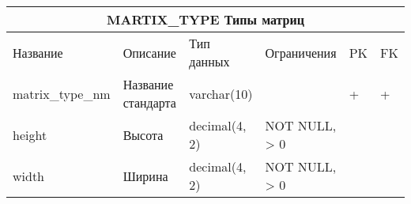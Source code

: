\documentclass{article}
\begin{document}
\begin{tabular}{ |p{4cm}|p{4cm}|p{2.5cm}|p{3.5cm}|p{2cm}|p{1cm}| }
\hline
\multicolumn{6}{|c|}{MARTIX\_TYPE Типы матриц} \\
\hline
Название & Описание & Тип данных & Ограничения & PK & FK\\
\hline
matrix\_type\_nm                    &   %
Название стандарта                  &   %
varchar(10)                         &   %
                                    &   %
 +                                  &   %
 +                                  \\  %
\hline
height                              &   %
Высота                              &   %
decimal(4, 2)                       &   %
NOT NULL, \linebreak
> 0                                 &   %
                                    &   %
                                    \\  %
\hline
width                               &   %
Ширина                              &   %
decimal(4, 2)                       &   %
NOT NULL, \linebreak
> 0                                 &   %
                                    &   %
                                    \\  %
\hline
\end{tabular}
\end{document}
